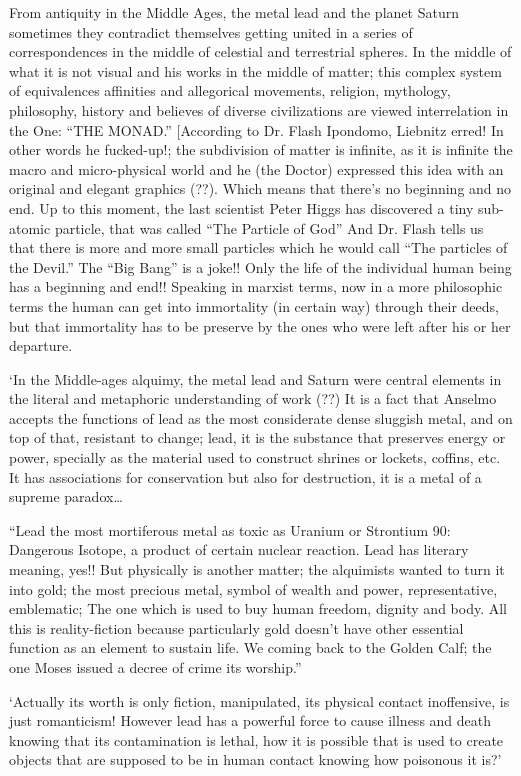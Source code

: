 \documentclass[smalldemyvopaper,11pt,twoside,onecolumn,openright,extrafontsizes]{memoir}
\begin{document}
From antiquity in the Middle Ages, the metal lead and the planet Saturn sometimes they contradict themselves getting united in a series of correspondences in the middle of celestial and terrestrial spheres. In the middle of what it is not visual and his works in the middle of matter; this complex system of equivalences affinities and allegorical movements, religion, mythology, philosophy, history and believes of diverse civilizations are viewed interrelation in the One: “THE MONAD.”  [According to Dr. Flash Ipondomo, Liebnitz erred! In other words he fucked-up!; the subdivision of matter is infinite, as it is infinite the macro and micro-physical world and he (the Doctor) expressed this idea with an original and elegant graphics (??). Which means that there’s no beginning and no end. Up to this moment, the last scientist Peter Higgs has discovered a tiny sub-atomic particle, that was called “The Particle of God” And Dr. Flash tells us that there is more and more small particles which he would call “The particles of the Devil.”  The “Big Bang” is a joke!! Only the life of the individual human being has a beginning and end!! Speaking in marxist terms, now in a more philosophic terms the human can get into immortality (in certain way) through their deeds, but that immortality has to be preserve by the ones who were left after his or her departure.  

‘In the Middle-ages alquimy, the metal lead and Saturn were central elements in the literal and metaphoric understanding of work (??) It is a fact that Anselmo accepts the functions of lead as the most considerate dense sluggish metal, and on top of that, resistant to change; lead, it is the substance that preserves energy or power, specially as the material used to construct shrines or lockets, coffins, etc. It has associations for conservation but also for destruction, it is a metal of a supreme paradox…

“Lead the most mortiferous metal as toxic as Uranium or Strontium 90: Dangerous Isotope, a product of certain nuclear reaction. Lead has literary meaning, yes!! But physically is another matter; the alquimists wanted to turn it into gold; the most precious metal, symbol of wealth and power, representative, emblematic; The one which is used to buy human freedom, dignity and body. All this is reality-fiction because particularly gold doesn’t have other essential function as an element to sustain life. We coming back to the Golden Calf; the one Moses issued a decree of crime its worship.”

‘Actually its worth is only fiction, manipulated, its physical contact inoffensive, is just romanticism! However lead has a powerful force to cause illness and death knowing that its contamination is lethal, how it is possible that is used to create objects that are supposed to be in human contact knowing how poisonous it is?’
\end{document}
